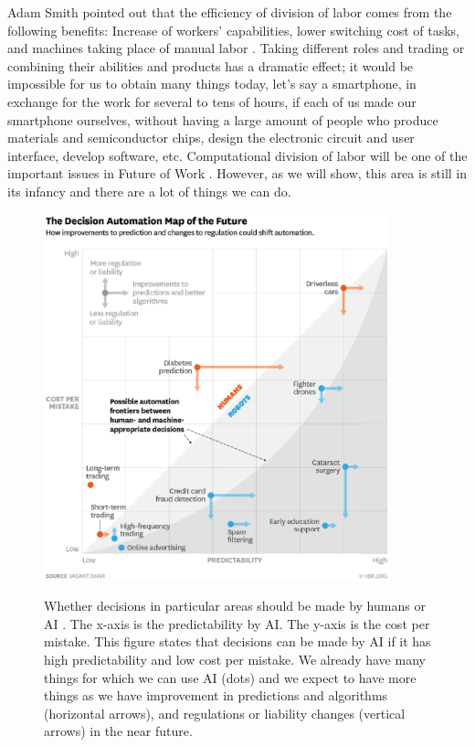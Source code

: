 Adam Smith pointed out that the efficiency of division of labor comes from the following benefits: Increase of workers' capabilities, lower switching cost of tasks, and machines taking place of manual labor \cite{Smi76}. 
Taking different roles and trading or combining their abilities and products has a dramatic effect; it would be impossible for us to obtain many things today, let's say a smartphone, in exchange for the work for several to tens of hours, if each of us made our smartphone ourselves, without having a large amount of people who produce materials and semiconductor chips, design the electronic circuit and user interface, develop software, etc.
Computational division of labor will be one of the important issues in Future of Work \cite{Sih+20}.
However, as we will show, this area is still in its infancy and there are a lot of things we can do.

\begin{figure}[t]
\centering
\includegraphics[width=100mm]{submissions/morishima/figures/decision-automation-map.eps}
\label{fig:decisions}
\caption{Whether decisions in particular areas should be made by humans or AI \cite{Dha16}. The x-axis is the predictability by AI. The y-axis is the cost per mistake.
This figure states that decisions can be made by AI if it has high predictability and low cost per mistake. We already have many things for which we can use AI (dots) and we expect to have more things as we have
improvement in predictions and algorithms (horizontal arrows), and regulations or liability changes (vertical arrows) in the near future.}
\end{figure}


